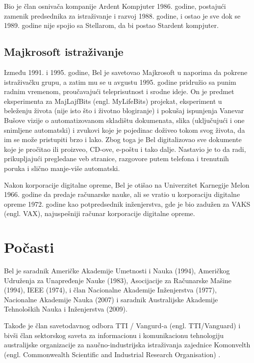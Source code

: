 \documentclass[a4paper]{article}
\begin{document}
{Bio je član osnivača kompanije Ardent Kompjuter 1986. godine, postajući zamenik predsednika za istraživanje i razvoj 1988. godine, i ostao je sve dok se 1989. godine nije spojio sa Stellarom, da bi postao Stardent kompjuter.
\subsection{Majkrosoft istraživanje}
\label{subsec:podnaslov1}
Između 1991. i 1995. godine, Bel je savetovao Majkrosoft u naporima da pokrene istraživačku grupu, a zatim mu se u avgustu 1995. godine pridružio sa punim radnim vremenom, proučavajući teleprisutnost i srodne ideje. On je predmet eksperimenta za MajLajfBits (engl. MyLifeBits) projekat, eksperiment u beleženju života (nije isto što i životno blogiranje) i pokušaj ispunjenja Vanevar Bušove vizije o automatizovanom skladištu dokumenata, slika (uključujući i one snimljene automatski) i zvukovi koje je pojedinac doživeo tokom svog života, da im se može pristupiti brzo i lako. Zbog toga je Bel digitalizovao sve dokumente koje je pročitao ili proizveo, CD-ove, e-poštu i tako dalje. Nastavio je to da radi, prikupljajući pregledane veb stranice, razgovore putem telefona i trenutnih poruka i slično manje-više automatski.

Nakon korporacije digitalne opreme, Bel je otišao na Univerzitet Karnegije Melon 1966. godine da predaje \-ra\-ču\-na\-rske nauke, ali se vratio u korporaciju digitalne opreme 1972. godine kao potpredsednik inženjerstva, gde je bio zadužen za VAKS (engl. VAX), najuspešniji računar korporacije digitalne opreme.


\section{Počasti}	
\label{sec:termini_i_citiranje}

Bel je saradnik Američke Akademije Umetnosti i Nauka (1994),\cite{bel3} Američkog Udruženja za Unapređenje Nauke (1983), Asocijacije za \-Ra\-ču\-nar\-ske Mašine (1994), IEEE (1974), i član Nacionalne Akademije \-Inže\-njer\-stva (1977), Nacionalne Akademije Nauka (2007) i saradnik Australijske Akademije Tehnoloških Nauka i Inženjerstva (2009).

Takođe je član savetodavnog odbora TTI / Vangurd-a (engl. TTI/Va\-nguard) i bivši član sektorskog saveta za informacionu i komunikacionu tehnologiju australijske organizacije za naučno-industrijska istraživanja zajednice Komonvelth (engl. Commonwealth Scientific and Industrial Research Organisation) .

}
\end{document}
